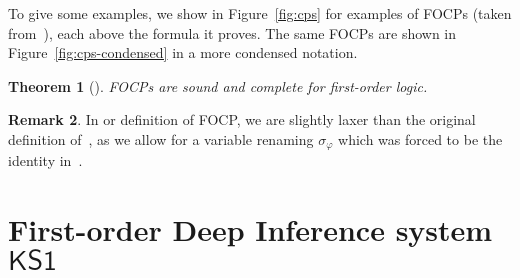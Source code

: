 \documentclass[conference,twosided,10pt]{IEEEtran}
\newtheorem{thm}{Theorem}%
\theoremstyle{definition}
\newtheorem{remark}[thm]{Remark}
\newcommand*{\FOKS}{\mathsf{KS1}}
\newcommand{\substof}[1]{\sigma_{\!#1}}
\renewcommand{\phi}{\varphi}
\begin{document}
To give some examples, we show in Figure~\ref{fig:cps} for examples of
FOCPs (taken from~\cite{hughes:fopws}), each above the formula it proves.  The same FOCPs are shown in
Figure~\ref{fig:cps-condensed} in a more condensed notation.

\begin{thm}[\cite{hughes:fopws}]
  \label{thm:FOCP}
  FOCPs are sound and complete for first-order logic.
\end{thm}

\begin{remark}
  In or definition of FOCP, we are slightly laxer than the original
  definition of~\cite{hughes:fopws}, as we allow for a variable
  renaming $\substof\phi$ which was forced to be the identity
  in~\cite{hughes:fopws}.
\end{remark}



\section{First-order Deep Inference system $\FOKS$}\label{sec:foks}
\end{document}
